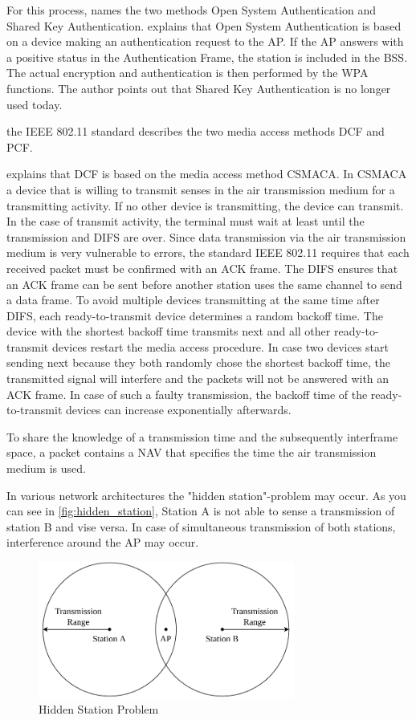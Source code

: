 \documentclass[]{nsm-thesis}
\begin{document}
For this process, \textcite{kauffels_wireless_2002} names the two methods Open System Authentication and Shared Key Authentication. \textcite{sauter_wireless_2022} explains that Open System Authentication is based on a device making an authentication request to the \ac{AP}. If the \ac{AP} answers with a positive status in the Authentication Frame, the station is included in the \ac{BSS}. The actual encryption and authentication is then performed by the \ac{WPA} functions. The author points out that Shared Key Authentication is no longer used today. 

 the IEEE 802.11 standard describes the two media access methods \ac{DCF} and \ac{PCF}.

\textcite{sauter_wireless_2022} explains that \ac{DCF} is based on the media access method \ac{CSMACA}. In \ac{CSMACA} a device that is willing to transmit senses in the air transmission medium for a transmitting activity. If no other device is transmitting, the device can transmit. In the case of transmit activity, the terminal must wait at least until the transmission and \ac{DIFS} are over.
Since data transmission via the air transmission medium is very vulnerable to errors, the standard IEEE 802.11 requires that each received packet must be confirmed with an \ac{ACK} frame.
The \ac{DIFS} ensures that an \ac{ACK} frame can be sent before another station uses the same channel to send a data frame. 
To avoid multiple devices transmitting at the same time after \ac{DIFS}, each ready-to-transmit device determines a random backoff time. The device with the shortest backoff time transmits next and all other ready-to-transmit devices restart the media access procedure. In case two devices start sending next because they both randomly chose the shortest backoff time, the transmitted signal will interfere and the packets will not be answered with an \ac{ACK} frame.
In case of such a faulty transmission, the backoff time of the ready-to-transmit devices can increase exponentially afterwards.

To share the knowledge of a transmission time and the subsequently interframe space, a packet contains a \ac{NAV} that specifies the time the air transmission medium is used.

In various network architectures the "hidden station"-problem may occur. As you can see in \autoref{fig:hidden_station}, Station A is not able to sense a transmission of station B and vise versa. In case of simultaneous transmission of both stations, interference around the \ac{AP} may occur. 
\begin{figure}%
	\centering
	\includegraphics[width=0.75\textwidth]{figures/hidden_station.pdf}
	\caption{Hidden Station Problem}%
	\label{fig:hidden_station}%
\end{figure}
\end{document}
